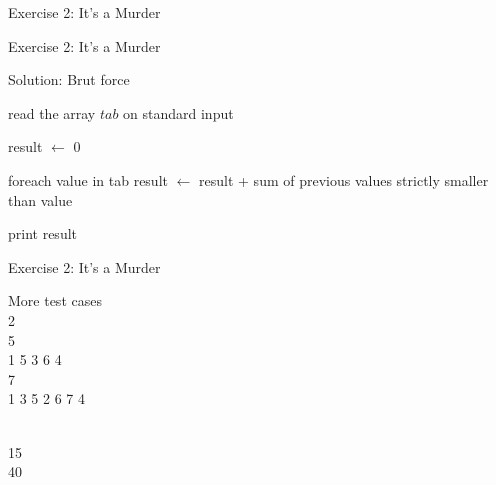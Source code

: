 \documentclass[handout]{beamer}
\begin{document}
\begin{frame}{Exercise 2: It's a Murder}
\begin{overlayarea}{\textwidth}{\textheight}

  \end{overlayarea}
\end{frame}

\begin{frame}[fragile]{Exercise 2: It's a Murder}

  \begin{code}{Solution: Brut force}
    \begin{PseudoCode}
read the array $tab$ on standard input    

result $\leftarrow$ 0

foreach value in tab
    result $\leftarrow$ result + sum of previous values strictly smaller than value

print result
    \end{PseudoCode}
  \end{code}
\end{frame}


\begin{frame}{Exercise 2: It's a Murder}

  \begin{exampleblock}{More test cases}
    \\
    2\\5\\1 5 3 6 4\\7\\1 3 5 2 6 7 4
    
    \medskip
    \\
    15\\40
  \end{exampleblock}
\end{frame}
\end{document}
